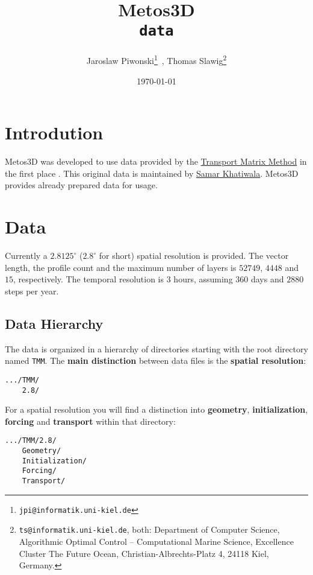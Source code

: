 \documentclass{article}
\begin{document}
%
%
\title{
Metos3D \\
\medskip
\texttt{data}
}
\author{
Jaroslaw Piwonski\thanks{\texttt{jpi@informatik.uni-kiel.de}} \,,
Thomas Slawig\thanks{\texttt{ts@informatik.uni-kiel.de},
both: Department of Computer Science, Algorithmic Optimal Control -- Computational Marine Science,
Excellence Cluster The Future Ocean, Christian-Albrechts-Platz 4, 24118 Kiel, Germany.}
}
\date{\today}
\maketitle

%
%
\section{Introdution}

Metos3D was developed to use data provided by the
\href{http://www.ldeo.columbia.edu/~spk/Research/TMM/tmm.html}{Transport Matrix Method}
in the first place \citep[cf. ][]{KhViCa05}.
%
This original data is maintained by
\href{http://www.ldeo.columbia.edu/~spk/}{Samar Khatiwala}.
%
Metos3D provides already prepared data for usage.

%
%
\section{Data}

Currently a $ 2.8125^\circ $ ($ 2.8^\circ $ for short) spatial resolution is provided.
The vector length, the profile count and the maximum number of layers is $ 52749 $, $ 4448 $
and $ 15 $, respectively. The temporal resolution is $ 3 $ hours,
assuming $ 360 $ days and $ 2880 $ steps per year.

%
%
\subsection{Data Hierarchy}

The data is organized in a hierarchy of directories starting with the
root directory named \texttt{TMM}.
The \textbf{main distinction} between data files is the \textbf{spatial resolution}:
\begin{verbatim}
.../TMM/
    2.8/
\end{verbatim}

For a spatial resolution you will find a distinction
into \textbf{geometry}, \textbf{initialization}, \textbf{forcing} and
\textbf{transport} within that directory:
\begin{verbatim}
.../TMM/2.8/
    Geometry/
    Initialization/
    Forcing/
    Transport/
\end{verbatim}
\end{document}
